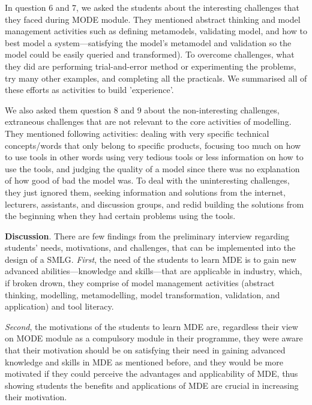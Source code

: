 \documentclass[12pt, a4paper]{report} \usepackage[titletoc]{appendix}
\begin{document}
In question 6 and 7, we asked the students about the interesting challenges that they faced during MODE module. They mentioned abstract thinking and model management activities such as defining metamodels, validating model, and how to best model a system---satisfying the model's metamodel and validation so the model could be easily queried and transformed). To overcome challenges, what they did are performing trial-and-error method or experimenting the problems, try many other examples, and completing all the practicals. We summarised all of these efforts as activities to build 'experience'.

We also asked them question 8 and 9 about the non-interesting challenges, extraneous challenges that are not relevant to the core activities of modelling. They mentioned following activities: dealing with very specific technical concepts/words that only belong to specific products, focusing too much on how to use tools in other words using very tedious tools or less information on how to use the tools, and judging the quality of a model since there was no explanation of how good of bad the model was. To deal with the uninteresting challenges, they just ignored them, seeking information and solutions from the internet, lecturers, assistants, and discussion groups, and redid building the solutions from the beginning when they had certain problems using the tools.

\textbf{Discussion}. There are few findings from the preliminary interview regarding students' needs, motivations, and challenges, that can be implemented into the design of a SMLG. \textit{First}, the need of the students to learn MDE is to gain new advanced abilities---knowledge and skills---that are applicable in industry, which, if broken drown, they comprise of model management activities (abstract thinking, modelling, metamodelling, model transformation, validation, and application) and tool literacy. 

\textit{Second}, the motivations of the students to learn MDE are, regardless their view on MODE module as a compulsory module in their programme, they were aware that their motivation should be on satisfying their need in gaining advanced knowledge and skills in MDE as mentioned before, and they would be more motivated if they could perceive the advantages and applicability of MDE, thus showing students the benefits and applications of MDE are crucial in increasing their motivation.
\end{document}
